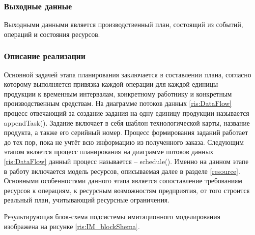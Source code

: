 \subsubsection*{Выходные данные}
Выходными данными является производственный план, состоящий из событий, операций и состояния ресурсов.

\subsubsection*{Описание реализации}
Основной задачей этапа планирования заключается в составлении плана, согласно которому выполняется привязка каждой операции для каждой единицы продукции к временным интервалам, конкретному работнику и конкретным производственным средствам. На диаграмме потоков данных \ref{ris:DataFlow} процесс отвечающий за создание задания на одну единицу продукции называется appendTask(). Задание включает в себя шаблон технологической карты, название продукта, а также его серийный номер. Процесс формирования заданий работает до тех пор, пока не учтёт всю информацию из полученного заказа. Следующим этапом является процесс планирования на диаграмме потоков данных \ref{ris:DataFlow} данный процесс называется – schedule(). Именно на данном этапе в работу включается модель ресурсов, описываемая далее в разделе \ref{resource}. Основными особенностями данного этапа является сопоставление требованиям ресурсов к операциям, к ресурсным возможностям предприятия, от того строится реальный план, учитывающий ресурсные ограничения.

Результирующая блок-схема подсистемы имитационного моделирования изображена на рисунке \ref{ris:IM_blockShema}.


